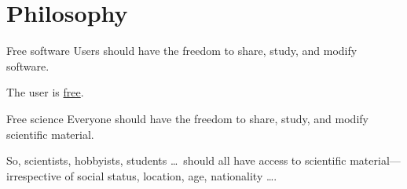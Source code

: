 \section{Philosophy}
\begin{frame}[c]{Free software}
  Users should have the freedom to \alert{share, study, and modify} software\footnotemark.
  \pause{}

  The \alert{user} is \href{https://www.fsf.org/about/what-is-free-software}{free}.

\end{frame}
\begin{frame}[c]{Free science}
  \alert{Everyone} should have the freedom to \alert{share, study, and modify} scientific material\footnotemark.
  \pause{}

  So, scientists, hobbyists, students \ldots\ should all have access to scientific material---irrespective of social status, location, age, nationality \ldots.
\end{frame}
